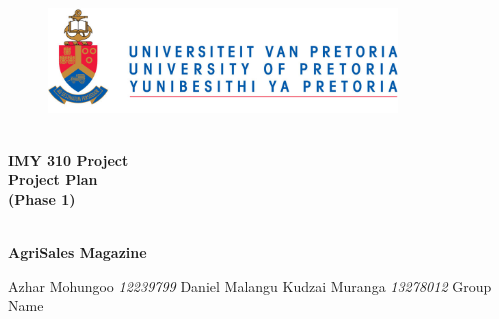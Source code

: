 \begin{titlepage}
	\begin{center}
		
		\begin{figure}[t]
			\centering
			\includegraphics[width=350px]{../Images/UP_Logo.png}
		\end{figure}
		
		\textsc{\large } \\ 
		\vspace{2cm}
		\textbf{\Huge IMY 310 Project  \\
			Project Plan \\
			(Phase 1)} \\ 

		\textsc{\large } \\ 
		\vspace{0.75cm}

		\textbf{\Large AgriSales Magazine} \\ 
		
		\begin{flushright} \large
			Azhar Mohungoo \emph{12239799} \newline
			Daniel Malangu \emph{} \newline
			Kudzai Muranga 	\emph{13278012} \newline
			\newline
			Group Name  \emph{} \newline
			\end{flushright}
		
	\end{center}
\end{titlepage}
